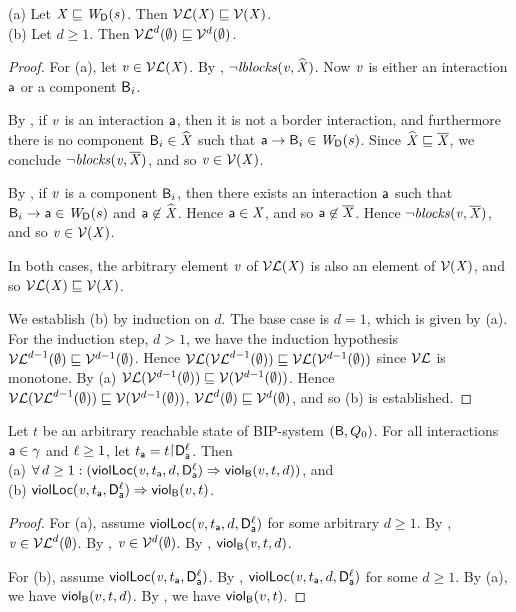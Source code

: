\begin{proposition}
\label{prop:lV-subg-V}
(a) Let $\XS \subg \lwfg{B}{s}{\DS}$. Then $\lVF{\XS} \subg \VF{\XS}$.\\
(b) Let $d \ge 1$. Then $\lVFs^{d} (\ewfg) \subg \VFs^{d} (\ewfg)$.
\end{proposition}
%
\begin{proof}
For (a), let $\ndv \in \lVF{\XS}$. By , $\neg \lblocks{\ndv}{\complL{\XS}}$.
Now $\ndv$ is either an interaction $\act$ or a component $\B_i$. 

By , if $\ndv$ is an interaction $\act$, then it is not a border interaction, and furthermore there is no
component $\B_i \in \complL{\XS}$ such that $\act \ar \B_i \in \lwfg{\B}{s}{\DS}$. 
Since $\complL{\XS} \subg \compl{\XS}$, we conclude $\neg \blocks{\ndv}{\compl{\XS}}$, and so $\ndv \in \VF{\XS}$.

By , if $\ndv$ is a component $\B_i$, then there exists an interaction $\act$ such that 
$\B_i \ar \act \in \lwfg{\B}{s}{\DS}$ and $\act \not\in \complL{\XS}$. Hence $\act \in \XS$, and so $\act \not\in \compl{\XS}$.
Hence  $\neg \blocks{\ndv}{\compl{\XS}}$, and so $\ndv \in \VF{\XS}$.

In both cases, the arbitrary element $\ndv$ of $\lVF{\XS}$ is also an element of $\VF{\XS}$, and so $\lVF{\XS} \subg \VF{\XS}$.

We establish (b) by induction on $d$. The base case is $d=1$, which is given by (a).
For the induction step, $d > 1$, we have the induction hypothesis $\lVFs^{d-1} (\ewfg) \subg \VFs^{d-1} (\ewfg)$. 
Hence $\lVF{\lVFs^{d-1} (\ewfg)} \subg \lVF{\VFs^{d-1} (\ewfg)}$ since $\lVFs$ is monotone.
By (a) $\lVF{\VFs^{d-1} (\ewfg)} \subg \VF{\VFs^{d-1} (\ewfg)}$. 
Hence  $\lVF{\lVFs^{d-1} (\ewfg)} \subg \VF{\VFs^{d-1} (\ewfg)}$, \ie
  $\lVFs^{d} (\ewfg) \subg \VFs^{d} (\ewfg)$, and so (b) is established.
\end{proof}


\begin{proposition}
\label{prop:locScViol-implies-scViol}
\label{prop:lviol-implies-viol}
Let $t$ be an arbitrary reachable state of BIP-system $(\B, Q_0)$.
For all interactions $\act \in \gamma$ and $\l \ge 1$, let $t_\act = t \pj \dsk{\act}{\l}$.
Then\\
\ind (a) $\fa d \ge 1:  (\scVLd{\ndv}{d}{t_\act}{\act}{\l} \imp \scVd{v}{d}{t}) $, and\\
\ind (b) $\scVL{\ndv}{t_\act}{\act}{\l} \imp \scV{v}{t}$.
\end{proposition}
%
\begin{proof}
For (a), assume $\scVLd{\ndv}{d}{t_\act}{\act}{\l}$ for some arbitrary $d \ge 1$.
By ,  $\ndv \in \lVFs^{d} (\ewfg)$.
By ,  $\ndv  \in \VFs^{d} (\ewfg)$.
By , $\scVd{\ndv}{d}{t}$.

For (b), assume $\scVL{\ndv}{t_\act}{\act}{\l}$. By ,
$\scVLd{\ndv}{d}{t_\act}{\act}{\l}$ for some $d \ge 1$. By (a), we have $\scVd{v}{d}{t}$.
By , we have $\scV{v}{t}$.
\end{proof}
